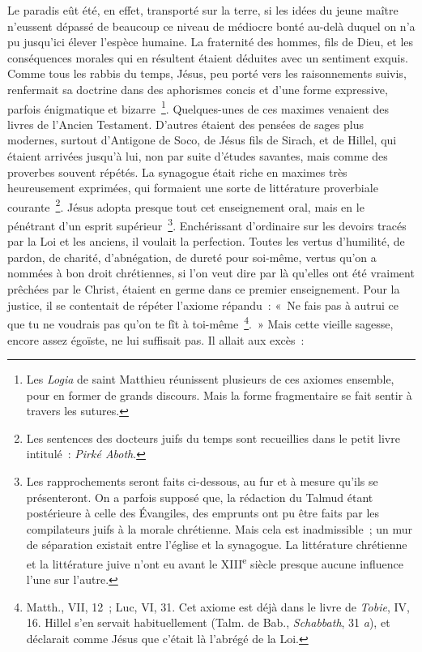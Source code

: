 \documentclass[french,twoside]{book} %
\begin{document}
Le paradis eût été, en effet, transporté sur la terre, si les idées du jeune maître n’eussent dépassé de beaucoup ce niveau de médiocre bonté au-delà duquel on n’a pu jusqu’ici élever l’espèce humaine. La fraternité des hommes, fils de Dieu, et les conséquences morales qui en résultent étaient déduites avec un sentiment exquis. Comme tous les rabbis du temps, Jésus, peu porté vers les raisonnements suivis, renfermait sa doctrine dans des aphorismes concis et d’une forme expressive, parfois énigmatique et bizarre \footnote{ Les {\itshape Logia} de saint Matthieu réunissent plusieurs de ces axiomes ensemble, pour en former de grands discours. Mais la forme fragmentaire se fait sentir à travers les sutures.}. Quelques-unes de ces maximes venaient des livres de l’Ancien Testament. D’autres étaient des pensées de sages plus modernes, surtout d’Antigone de Soco, de Jésus fils de Sirach, et de Hillel, qui étaient arrivées jusqu’à lui, non par suite d’études savantes, mais comme des proverbes souvent répétés. La synagogue était riche en maximes très heureusement exprimées, qui formaient une sorte de littérature proverbiale courante \footnote{ Les sentences des docteurs juifs du temps sont recueillies dans le petit livre intitulé : {\itshape Pirké Aboth}.}. Jésus adopta presque tout cet enseignement oral, mais en le pénétrant d’un esprit supérieur \footnote{ Les rapprochements seront faits ci-dessous, au fur et à mesure qu’ils se présenteront. On a parfois supposé que, la rédaction du Talmud étant postérieure à celle des Évangiles, des emprunts ont pu être faits par les compilateurs juifs à la morale chrétienne. Mais cela est inadmissible ; un mur de séparation existait entre l’église et la synagogue. La littérature chrétienne et la littérature juive n’ont eu avant le XIII\textsuperscript{e} siècle presque aucune influence l’une sur l’autre.}. Enchérissant d’ordinaire sur les devoirs tracés par la Loi et les anciens, il voulait la perfection. Toutes les vertus d’humilité, de pardon, de charité, d’abnégation, de dureté pour soi-même, vertus qu’on a nommées à bon droit chrétiennes, si l’on veut dire par là qu’elles ont été vraiment prêchées par le Christ, étaient en germe dans ce premier enseignement. Pour la justice, il se contentait de répéter l’axiome répandu : « Ne fais pas à autrui ce que tu ne voudrais pas qu’on te fît à toi-même \footnote{ Matth., VII, 12 ; Luc, VI, 31. Cet axiome est déjà dans le livre de {\itshape Tobie}, IV, 16. Hillel s’en servait habituellement (Talm. de Bab., {\itshape Schabbath}, 31 {\itshape a}), et déclarait comme Jésus que c’était là l’abrégé de la Loi.}. » Mais cette vieille sagesse, encore assez égoïste, ne lui suffisait pas. Il allait aux excès :\par
\end{document}
